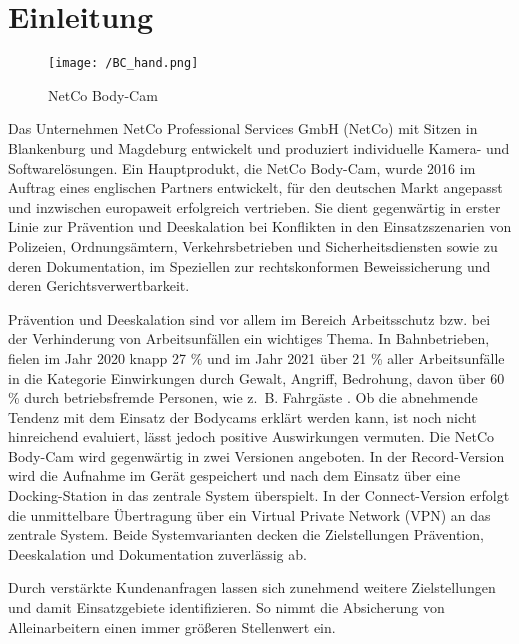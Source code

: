 \documentclass[thesis.tex]{subfiles}
\begin{document}
\chapter{Einleitung}
\label{chap:Einleitung}

\begin{figure}[h]
    \centering
    \texttt{[image: /BC\_hand.png]}
    \caption[NetCo Body-Cam]{NetCo Body-Cam \cite{netco}}
    \label{fig:BC}
\end{figure}

Das Unternehmen NetCo Professional Services GmbH (NetCo) mit Sitzen in Blankenburg und Magdeburg entwickelt und produziert individuelle Kamera- und Softwarelösungen.
Ein Hauptprodukt, die NetCo Body-Cam, wurde 2016 im Auftrag eines englischen Partners entwickelt, für den deutschen Markt angepasst und inzwischen europaweit erfolgreich vertrieben.
Sie dient gegenwärtig in erster Linie zur Prävention und Deeskalation bei Konflikten in den Einsatzszenarien von Polizeien, Ordnungsämtern, Verkehrsbetrieben und Sicherheitsdiensten sowie zu deren Dokumentation, im Speziellen zur rechtskonformen Beweissicherung und deren Gerichtsverwertbarkeit.

Prävention und Deeskalation sind vor allem im Bereich Arbeitsschutz bzw. bei der Verhinderung von Arbeitsunfällen ein wichtiges Thema.
In Bahnbetrieben, fielen im Jahr 2020 knapp 27 \% und im Jahr 2021 über 21 \% aller Arbeitsunfälle in die Kategorie \glqq Einwirkungen durch Gewalt, Angriff, Bedrohung\grqq{}, davon über 60 \% durch betriebsfremde Personen, wie z.~B. Fahrgäste \cite[vgl.~S.~87~ff.][]{Unfallgeschehen2020,Unfallgeschehen2021}.
Ob die abnehmende Tendenz mit dem Einsatz der Bodycams erklärt werden kann, ist noch nicht hinreichend evaluiert, lässt jedoch positive Auswirkungen vermuten.
Die NetCo Body-Cam wird gegenwärtig in zwei Versionen angeboten.
In der Record-Version wird die Aufnahme im Gerät gespeichert und nach dem Einsatz über eine Docking-Station in das zentrale System überspielt.
In der Connect-Version erfolgt die unmittelbare Übertragung über ein \glqq Virtual Private Network\grqq{} (VPN) an das zentrale System.
Beide Systemvarianten decken die Zielstellungen Prävention, Deeskalation und Dokumentation zuverlässig ab.

Durch verstärkte Kundenanfragen lassen sich zunehmend weitere Zielstellungen und damit Einsatzgebiete identifizieren.
So nimmt die Absicherung von Alleinarbeitern einen immer größeren Stellenwert ein.
\end{document}
